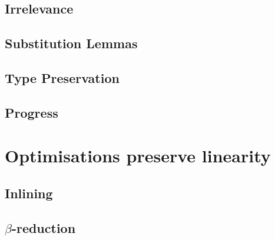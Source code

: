 \documentclass[acmsmall,review,anonymous,screen]{acmart}
\begin{document}
\subsection{Irrelevance\label{sec:proof:irrelevance}}



\subsection{Substitution Lemmas\label{sec:proof:substitution-lemmas}}









\subsection{Type Preservation\label{sec:proof:type-preservation}}



\subsection{Progress\label{sec:proof:progress}}







\section{Optimisations preserve linearity}\label{app:optimisations}

\subsection{Inlining}


\subsection{\texorpdfstring{$\beta$}{Beta}-reduction}


\end{document}
